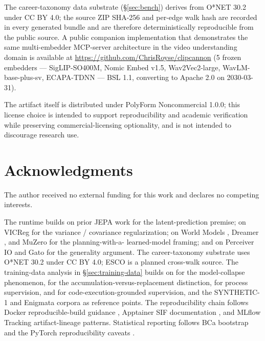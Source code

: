 \documentclass[10pt,twocolumn,letterpaper]{article}
\begin{document}
The career-taxonomy data substrate
(\S\ref{sec:bench}) derives from O*NET 30.2
\citep{onet2026} under CC BY 4.0; the source ZIP SHA-256 and
per-edge walk hash are recorded in every generated bundle and
are therefore deterministically reproducible from the public
source. A public companion implementation that demonstrates the
same multi-embedder MCP-server architecture in the video
understanding domain is available at
\url{https://github.com/ChrisRoyse/clipcannon} (5 frozen
embedders --- SigLIP-SO400M, Nomic Embed v1.5, Wav2Vec2-large,
WavLM-base-plus-sv, ECAPA-TDNN --- BSL 1.1, converting to
Apache 2.0 on 2030-03-31).

The artifact itself is distributed under PolyForm
Noncommercial 1.0.0; this license choice is intended to
support reproducibility and academic verification while
preserving commercial-licensing optionality, and is not
intended to discourage research use.

\section{Acknowledgments}

The author received no external funding for this work and
declares no competing interests.

The runtime builds on prior JEPA work
\citep{assran2023ijepa,bardes2024vjepa,maes2026leworldmodel,chen2026vljepa}
for the latent-prediction premise; on VICReg
\citep{bardes2022vicreg} for the variance / covariance
regularization; on World Models
\citep{ha2018worldmodels}, Dreamer \citep{hafner2023dreamerv3}, and
MuZero \citep{schrittwieser2019muzero} for the planning-with-a-
learned-model framing; and on Perceiver IO
\citep{jaegle2022perceiverio} and Gato \citep{reed2022gato} for the
generality argument. The career-taxonomy substrate uses O*NET 30.2
\citep{onet2026} under CC BY 4.0; ESCO \citep{esco2025} is a planned
cross-walk source. The training-data analysis in
\S\ref{sec:training-data} builds on
\citet{shumailov2023curse,shumailov2024nature} for the
model-collapse phenomenon, \citet{gerstgrasser2024accumulate} for
the accumulation-versus-replacement distinction,
\citet{lightman2023verify} for process supervision, and
\citet{jung2025codeexec} for code-execution-grounded supervision,
and the SYNTHETIC-1 \citep{primeintellect2025synthetic1} and
Enigmata \citep{seed2025enigmata} corpora as reference points. The
reproducibility chain follows Docker reproducible-build guidance
\citep{docker2025reproducible, docker2024bestpractices}, Apptainer
SIF documentation \citep{apptainer2025buildsif}, and MLflow
Tracking \citep{mlflow2024} artifact-lineage patterns. Statistical
reporting follows BCa bootstrap \citep{efron2020automatic} and the
PyTorch reproducibility caveats \citep{pytorch2026reproducibility}.
\end{document}
